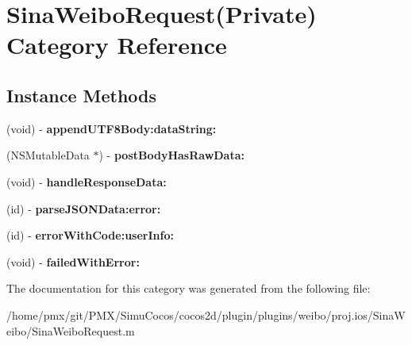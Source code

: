 \hypertarget{categorySinaWeiboRequest_07Private_08}{}\section{Sina\+Weibo\+Request(Private) Category Reference}
\label{categorySinaWeiboRequest_07Private_08}
\subsection*{Instance Methods}
\begin{DoxyCompactItemize}
\item 
\mbox{\label{categorySinaWeiboRequest_07Private_08_a3de6626231ac99e7d2f2b4a7e1959a10}} 
(void) -\/ {\bfseries append\+U\+T\+F8\+Body\+:data\+String\+:}
\item 
\mbox{\label{categorySinaWeiboRequest_07Private_08_aee26157b1af661fa0ad9d3b5f606db73}} 
(N\+S\+Mutable\+Data $\ast$) -\/ {\bfseries post\+Body\+Has\+Raw\+Data\+:}
\item 
\mbox{\label{categorySinaWeiboRequest_07Private_08_a8f257660f959b6f5af4f4fbeebbf7972}} 
(void) -\/ {\bfseries handle\+Response\+Data\+:}
\item 
\mbox{\label{categorySinaWeiboRequest_07Private_08_aa89031a2fa3d632da3e5dc41ade1f1bc}} 
(id) -\/ {\bfseries parse\+J\+S\+O\+N\+Data\+:error\+:}
\item 
\mbox{\label{categorySinaWeiboRequest_07Private_08_ae9e0ea304a9fe87b22a36b9e648a3c27}} 
(id) -\/ {\bfseries error\+With\+Code\+:user\+Info\+:}
\item 
\mbox{\label{categorySinaWeiboRequest_07Private_08_a355b0981709d1fb02d1d27172f60d12f}} 
(void) -\/ {\bfseries failed\+With\+Error\+:}
\end{DoxyCompactItemize}


The documentation for this category was generated from the following file\+:\begin{DoxyCompactItemize}
\item 
/home/pmx/git/\+P\+M\+X/\+Simu\+Cocos/cocos2d/plugin/plugins/weibo/proj.\+ios/\+Sina\+Weibo/Sina\+Weibo\+Request.\+m\end{DoxyCompactItemize}
